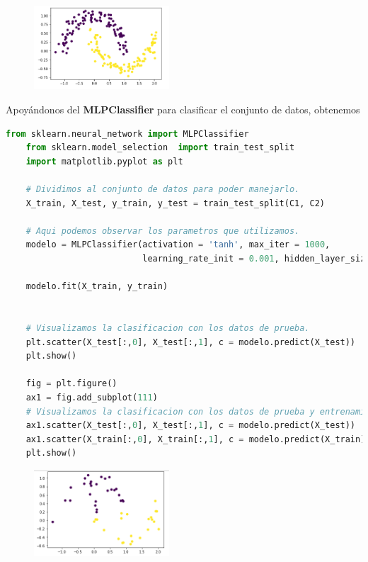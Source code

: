 \documentclass[letterpaper,11pt]{article}
\begin{document}
\begin{enumerate}
    \begin{figure}[ht]
        \centering
        \includegraphics[width=0.45\textwidth]{./imagenes/datos.png}
    \end{figure}  
    
    Apoyándonos del \textbf{MLPClassifier} para clasificar el conjunto de 
    datos, obtenemos 
    \begin{lstlisting}[language=Python]
    from sklearn.neural_network import MLPClassifier
    from sklearn.model_selection  import train_test_split                       
    import matplotlib.pyplot as plt

    # Dividimos al conjunto de datos para poder manejarlo.
    X_train, X_test, y_train, y_test = train_test_split(C1, C2)

    # Aqui podemos observar los parametros que utilizamos.
    modelo = MLPClassifier(activation = 'tanh', max_iter = 1000, 
                           learning_rate_init = 0.001, hidden_layer_sizes = (10,4))

    modelo.fit(X_train, y_train)


    # Visualizamos la clasificacion con los datos de prueba. 
    plt.scatter(X_test[:,0], X_test[:,1], c = modelo.predict(X_test))
    plt.show()

    fig = plt.figure()
    ax1 = fig.add_subplot(111)
    # Visualizamos la clasificacion con los datos de prueba y entrenamiento.
    ax1.scatter(X_test[:,0], X_test[:,1], c = modelo.predict(X_test))
    ax1.scatter(X_train[:,0], X_train[:,1], c = modelo.predict(X_train))
    plt.show()
    \end{lstlisting}

    \begin{figure}[ht]
        \centering
        \includegraphics[width=0.45\textwidth]{./imagenes/clasificacion2-1.png}
    \end{figure} 


\end{enumerate}
\end{document}
